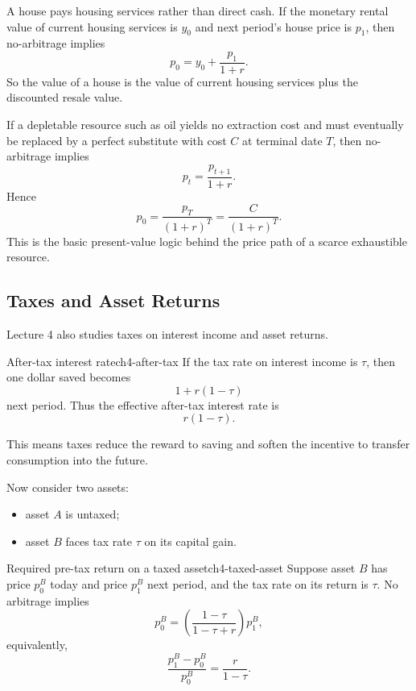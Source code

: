 \begin{policynote}[title={Policy Application: housing as an asset}]
A house pays housing services rather than direct cash. If the monetary rental value of current housing services is $y_0$ and next period's house price is $p_1$, then no-arbitrage implies
\[
p_0 = y_0 + \frac{p_1}{1+r}.
\]
So the value of a house is the value of current housing services plus the discounted resale value.
\end{policynote}

\begin{policynote}[title={Policy Application: depletable resources}]
If a depletable resource such as oil yields no extraction cost and must eventually be replaced by a perfect substitute with cost $C$ at terminal date $T$, then no-arbitrage implies
\[
p_t = \frac{p_{t+1}}{1+r}.
\]
Hence
\[
p_0 = \frac{p_T}{(1+r)^T} = \frac{C}{(1+r)^T}.
\]
This is the basic present-value logic behind the price path of a scarce exhaustible resource.
\end{policynote}

\subsection{Taxes and Asset Returns}

Lecture 4 also studies taxes on interest income and asset returns.

\begin{definition}{After-tax interest rate}{ch4-after-tax}
If the tax rate on interest income is $\tau$, then one dollar saved becomes
\[
1+r(1-\tau)
\]
next period. Thus the effective after-tax interest rate is
\[
r(1-\tau).
\]
\end{definition}

This means taxes reduce the reward to saving and soften the incentive to transfer consumption into the future.

Now consider two assets:
\begin{itemize}
    \item asset $A$ is untaxed;
    \item asset $B$ faces tax rate $\tau$ on its capital gain.
\end{itemize}

\begin{theorem}{Required pre-tax return on a taxed asset}{ch4-taxed-asset}
Suppose asset $B$ has price $p_0^B$ today and price $p_1^B$ next period, and the tax rate on its return is $\tau$. No arbitrage implies
\[
p_0^B = \left(\frac{1-\tau}{1-\tau+r}\right)p_1^B,
\]
equivalently,
\[
\frac{p_1^B-p_0^B}{p_0^B}=\frac{r}{1-\tau}.
\]
\end{theorem}

